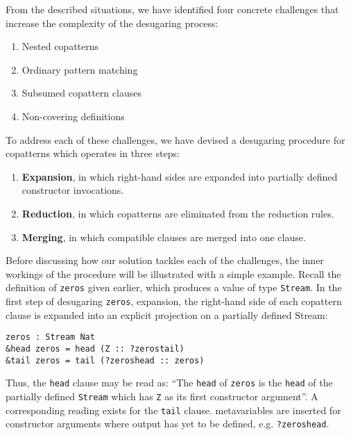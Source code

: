 From the described situations, we have identified four concrete challenges that
increase the complexity of the desugaring process:

\begin{enumerate}
\item Nested copatterns
\item Ordinary pattern matching
\item Subsumed copattern clauses
\item Non-covering definitions
\end{enumerate}

To address each of these challenges, we have devised a desugaring procedure for
copatterns which operates in three steps:

\begin{enumerate}
\item \textbf{Expansion}, in which right-hand sides are expanded into partially
  defined constructor invocations.
\item \textbf{Reduction}, in which copatterns are eliminated from the reduction rules.
\item \textbf{Merging}, in which compatible clauses are merged into one clause.
\end{enumerate}

Before discussing how our solution tackles each of the challenges, the inner
workings of the procedure will be illustrated with a simple example. Recall the
definition of \texttt{zeros} given earlier, which produces a value of type
\texttt{Stream}. In the first step
of desugaring \texttt{zeros}, expansion, the right-hand side of each copattern
clause is expanded into an explicit projection on a partially defined
Stream:
\begin{lstlisting}[mathescape,title=\idrisBlock]
zeros : Stream Nat
&head zeros = head (Z :: ?zerostail)
&tail zeros = tail (?zeroshead :: zeros)
\end{lstlisting}
Thus, the \texttt{head} clause may be read as: ``The \texttt{head} of
\texttt{zeros} is the \texttt{head} of the partially defined \texttt{Stream}
which has \texttt{Z} as its first constructor argument''. A corresponding
reading exists for the \texttt{tail} clause. \IdrisM{} metavariables are
inserted for constructor arguments where output has yet to be defined,
e.g. \texttt{?zeroshead}.

